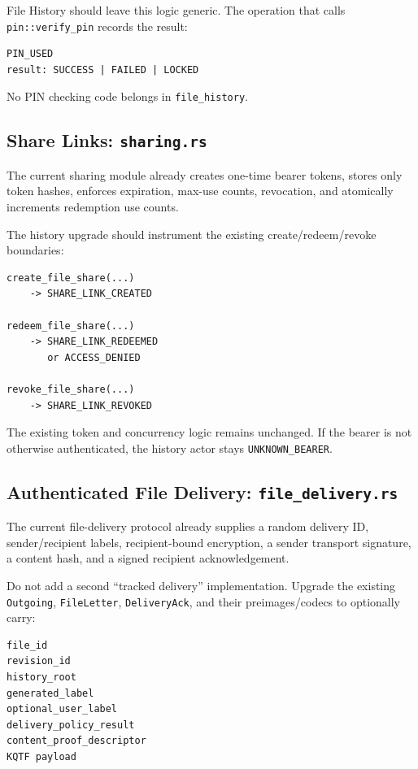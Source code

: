 \documentclass[11pt]{article}
\begin{document}
File History should leave this logic generic. The operation that calls \texttt{pin::verify\_pin} records the result:

\begin{lstlisting}
PIN_USED
result: SUCCESS | FAILED | LOCKED
\end{lstlisting}

No PIN checking code belongs in \texttt{file\_history}.

\subsection{Share Links: \texttt{sharing.rs}}

The current sharing module already creates one-time bearer tokens, stores only token hashes, enforces expiration, max-use counts, revocation, and atomically increments redemption use counts.

The history upgrade should instrument the existing create/redeem/revoke boundaries:

\begin{lstlisting}
create_file_share(...)
    -> SHARE_LINK_CREATED

redeem_file_share(...)
    -> SHARE_LINK_REDEEMED
       or ACCESS_DENIED

revoke_file_share(...)
    -> SHARE_LINK_REVOKED
\end{lstlisting}

The existing token and concurrency logic remains unchanged. If the bearer is not otherwise authenticated, the history actor stays \texttt{UNKNOWN\_BEARER}.

\subsection{Authenticated File Delivery: \texttt{file\_delivery.rs}}

The current file-delivery protocol already supplies a random delivery ID, sender/recipient labels, recipient-bound encryption, a sender transport signature, a content hash, and a signed recipient acknowledgement.

Do not add a second ``tracked delivery'' implementation. Upgrade the existing \texttt{Outgoing}, \texttt{FileLetter}, \texttt{DeliveryAck}, and their preimages/codecs to optionally carry:

\begin{lstlisting}
file_id
revision_id
history_root
generated_label
optional_user_label
delivery_policy_result
content_proof_descriptor
KQTF payload
\end{lstlisting}
\end{document}
